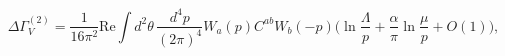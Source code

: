 \begin{equation}\label{2-Loop_Effective_Action}
\Delta\Gamma^{(2)}_{V} = \frac{1}{16\pi^2}\mbox{Re} \int d^2\theta\,
\frac{d^4p}{(2\pi)^4} W_a(p) C^{ab} W_b(-p)
\Bigg(\ln\frac{\Lambda}{p}
+\frac{\alpha}{\pi}\ln\frac{\mu}{p}+O(1)\Bigg),
\end{equation}

